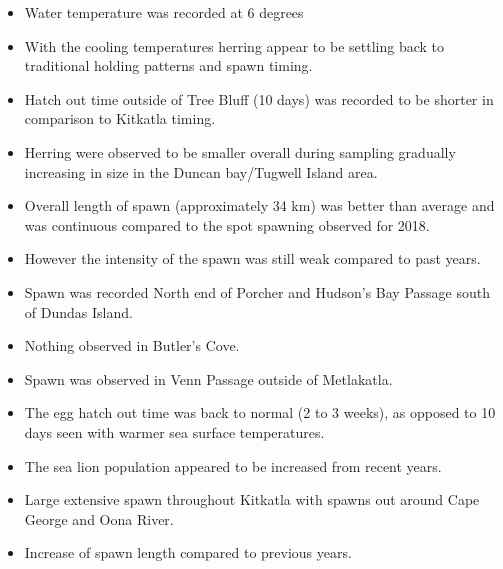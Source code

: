 \begin{itemize}

\item Water temperature was recorded at 6 degrees
\item With the cooling temperatures herring appear to be settling back to traditional holding patterns and spawn timing. 
\item Hatch out time outside of Tree Bluff (10 days) was recorded to be shorter in comparison to Kitkatla timing. 
\item Herring were observed to be smaller overall during sampling gradually increasing in size in the Duncan bay/Tugwell Island area. 
\item Overall length of spawn (approximately 34 km) was better than average and was continuous compared to the spot spawning observed for 2018. 
\item However the intensity of the spawn was still weak compared to past years. 
\item Spawn was recorded North end of Porcher and Hudson's Bay Passage south of Dundas Island.
\item Nothing observed in Butler's Cove. 
\item Spawn was observed in Venn Passage outside of Metlakatla. 

\item The egg hatch out time was back to normal (2 to 3 weeks), as opposed to 10 days seen with warmer sea surface temperatures.
\item The sea lion population appeared to be increased from recent years.
\item Large extensive spawn throughout Kitkatla with spawns out around Cape George and Oona River.
\item Increase of spawn length compared to previous years.

\end{itemize}